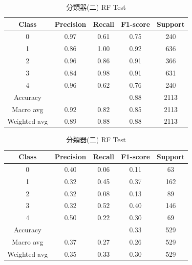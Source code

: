 \begin{enumerate}
\begin{enumerate}
            \begin{table}[H]
            \centering
            \scriptsize
            \begin{minipage}{0.48\textwidth}
            \centering
            \begin{tabular}{c|cccc}
            \hline
            Class & Precision & Recall & F1-score & Support \\
            \hline
            0 & 0.97 & 0.61 & 0.75 & 240 \\
            1 & 0.86 & 1.00 & 0.92 & 636 \\
            2 & 0.96 & 0.86 & 0.91 & 366 \\
            3 & 0.84 & 0.98 & 0.91 & 631 \\
            4 & 0.96 & 0.62 & 0.76 & 240 \\
            \hline
            Accuracy &       &       & 0.88 & 2113 \\
            Macro avg & 0.92 & 0.82 & 0.85 & 2113 \\
            Weighted avg & 0.89 & 0.88 & 0.88 & 2113 \\
            \hline
            \end{tabular}
            \caption{分類器(二) RF Train}
            \label{tab:classifier_2_report_train_logreg_rf_filtered}
            \end{minipage}%
            \hfill
            \begin{minipage}{0.48\textwidth}
            \centering
            \begin{tabular}{c|cccc}
            \hline
            Class & Precision & Recall & F1-score & Support \\
            \hline
            0 & 0.40 & 0.06 & 0.11 & 63 \\
            1 & 0.32 & 0.45 & 0.37 & 162 \\
            2 & 0.32 & 0.08 & 0.13 & 89 \\
            3 & 0.32 & 0.52 & 0.40 & 146 \\
            4 & 0.50 & 0.22 & 0.30 & 69 \\
            \hline
            Accuracy &       &       & 0.33 & 529 \\
            Macro avg & 0.37 & 0.27 & 0.26 & 529 \\
            Weighted avg & 0.35 & 0.33 & 0.30 & 529 \\
            \hline
            \end{tabular}
            \caption{分類器(二) RF Test}
            \label{tab:classifier_2_report_test_logreg_rf_filtered}
            \end{minipage}
            \end{table}


\end{enumerate}
\end{enumerate}
